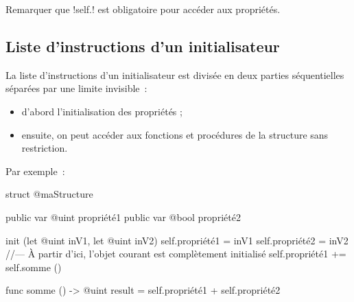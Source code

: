 Remarquer que \ggsq!self.! est obligatoire pour accéder aux propriétés.

\subsection{Liste d'instructions d'un initialisateur}

La liste d'instructions d'un initialisateur est divisée en deux parties séquentielles séparées par une limite invisible~:
\begin{itemize}
  \item d'abord l'initialisation des propriétés ;
  \item ensuite, on peut accéder aux fonctions et procédures de la structure sans restriction.
\end{itemize}

Par exemple~:
\begin{galgas34}
struct @maStructure {
  public var @uint propriété1
  public var @bool propriété2
  
  init (let @uint inV1, let @uint inV2) {
    self.propriété1 = inV1
    self.propriété2 = inV2
  //--- À partir d'ici, l'objet courant est complètement initialisé
    self.propriété1 += self.somme ()
  }
  
  func somme () -> @uint {
    result = self.propriété1 + self.propriété2
  }
}
\end{galgas34}


%
%
%
%
%
%
%


